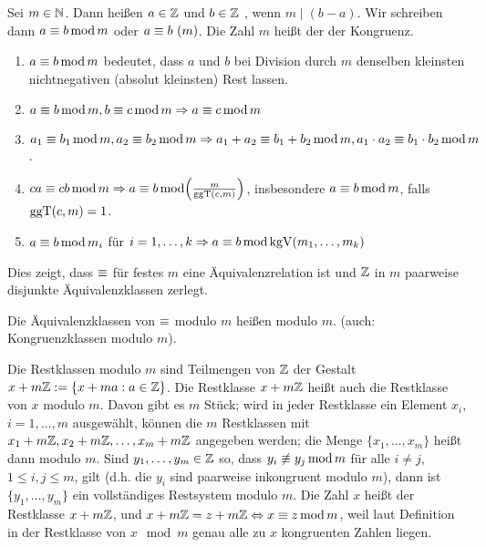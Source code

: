 \begin{defn}
	Sei $m \in \mathbb{N}$. Dann heißen $a \in \mathbb{Z}$ und $b \in \mathbb{Z}$ , wenn $m \mid (b-a)$. Wir schreiben dann $a \equiv b \operatorname{mod} m$ oder $a \equiv b \ (m)$. Die Zahl $m$ heißt der  der Kongruenz. 
\end{defn}

\begin{folg}
\label{folg_1.1.2.2}
	\begin{enumerate}[(1)]
		\item $a \equiv b \operatorname{mod} m$ bedeutet, dass $a$ und $b$ bei Division durch $m$ denselben kleinsten nichtnegativen (absolut kleinsten) Rest lassen.
		\item $a \equiv b \operatorname{mod} m, b \equiv c \operatorname{mod} m \Rightarrow a \equiv c \operatorname{mod} m$
		\item $a_1 \equiv b_1 \operatorname{mod} m, a_2 \equiv b_2 \operatorname{mod} m \Rightarrow a_1 + a_2 \equiv b_1 + b_2 \operatorname{mod} m, a_1 \cdot a_2 \equiv b_1 \cdot b_2 \operatorname{mod} m$.
		\item $ca \kon cb \modu m \Rightarrow a \kon b \modu \enbrace*{\frac{m}{\ggT(c,m)}}$, insbesondere $a \equiv b \operatorname{mod} m$, falls $\operatorname{ggT}(c,m) = 1$.
		\item $a \equiv b \operatorname{mod} m_i$ für $i = 1, \dots, k \Rightarrow a \equiv b \operatorname{mod} \operatorname{kgV}(m_1,\dots,m_k)$
	\end{enumerate}
	Dies zeigt, dass $\equiv$ für festes $m$ eine Äquivalenzrelation ist und $\mathbb{Z}$ in $m$ paarweise disjunkte Äquivalenzklassen zerlegt.
\end{folg}

\begin{defn}[Restklasse]
	Die Äquivalenzklassen von $\equiv$ modulo $m$ heißen  modulo $m$. (auch: Kongruenzklassen modulo $m$). 
\end{defn}

\begin{folg}
	Die Restklassen modulo $m$ sind Teilmengen von $\mathbb{Z}$ der Gestalt $x + m\mathbb{Z} := \{x + ma : a \in \mathbb{Z}\}$. Die Restklasse $x + m\mathbb{Z}$ heißt auch die Restklasse von $x$ modulo $m$. Davon gibt es $m$ Stück; wird in jeder Restklasse ein Element $x_i$, $i = 1, \dots, m$ ausgewählt, können die $m$ Restklassen mit $x_1 + m\mathbb{Z}, x_2 + m\mathbb{Z}, \dots, x_m + m\mathbb{Z}$ angegeben werden; die Menge $\{x_1,\dots,x_m\}$ heißt dann  modulo $m$. Sind $y_1, \dots, y_m \in \mathbb{Z}$ so, dass $y_i \not\equiv y_j \operatorname{mod} m$ für alle $i \neq j$, $1 \leq i,j \leq m$, gilt (d.h. die $y_i$ sind paarweise inkongruent modulo $m$), dann ist $\{y_1, \dots, y_m\}$ ein vollständiges Restsystem modulo $m$. Die Zahl $x$ heißt  der Restklasse $x + m\mathbb{Z}$, und $x + m\mathbb{Z} = z + m\mathbb{Z} \Leftrightarrow x \equiv z \operatorname{mod} m$, weil laut Definition in der Restklasse von $x \mod m$ genau alle zu $x$ kongruenten Zahlen liegen. 
\end{folg}

